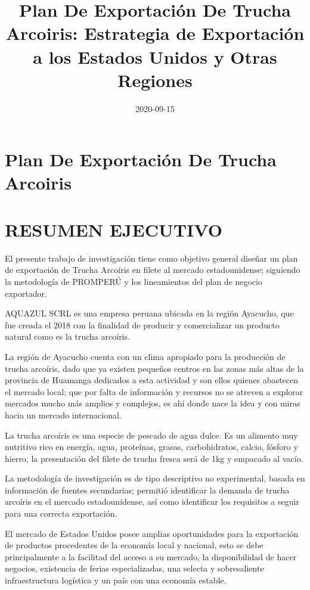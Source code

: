 \documentclass[
  stu,
  floatsintext,
  longtable,
  a4paper,
  nolmodern,
  notxfonts,
  notimes,
  colorlinks=true,linkcolor=blue,citecolor=blue,urlcolor=blue]{apa7}
\title{Plan De Exportación De Trucha Arcoiris: Estrategia de Exportación
a los Estados Unidos y Otras Regiones}
\date{2020-09-15}
\begin{document}
\maketitle

\hypertarget{toc}{}
\tableofcontents
\newpage
\section[Introduction]{Plan De Exportación De Trucha Arcoiris}

\setcounter{secnumdepth}{-\maxdimen} %

\setlength\LTleft{0pt}


\section{RESUMEN EJECUTIVO}\label{resumen-ejecutivo}

El presente trabajo de investigación tiene como objetivo general diseñar
un plan de exportación de Trucha Arcoíris en filete al mercado
estadounidense; siguiendo la metodología de PROMPERÚ y los lineamientos
del plan de negocio exportador.

AQUAZUL SCRL es una empresa peruana ubicada en la región Ayacucho, que
fue creada el 2018 con la finalidad de producir y comercializar un
producto natural como es la trucha arcoíris.

La región de Ayacucho cuenta con un clima apropiado para la producción
de trucha arcoíris, dado que ya existen pequeños centros en las zonas
más altas de la provincia de Huamanga dedicados a esta actividad y son
ellos quienes abastecen el mercado local; que por falta de información y
recursos no se atreven a explorar mercados mucho más amplios y
complejos, es ahí donde nace la idea y con miras hacia un mercado
internacional.

La trucha arcoíris es una especie de pescado de agua dulce. Es un
alimento muy nutritivo rico en energía, agua, proteínas, grasas,
carbohidratos, calcio, fósforo y hierro, la presentación del filete de
trucha fresca será de 1kg y empacado al vacío.

La metodología de investigación es de tipo descriptivo no experimental,
basada en información de fuentes secundarias; permitió identificar la
demanda de trucha arcoíris en el mercado estadounidense, así como
identificar los requisitos a seguir para una correcta exportación.

El mercado de Estados Unidos posee amplias oportunidades para la
exportación de productos procedentes de la economía local y nacional,
esto se debe principalmente a la facilitad del acceso a su mercado, la
disponibilidad de hacer negocios, existencia de ferias especializadas,
una selecta y sobresaliente infraestructura logística y un país con una
economía estable.
\end{document}
